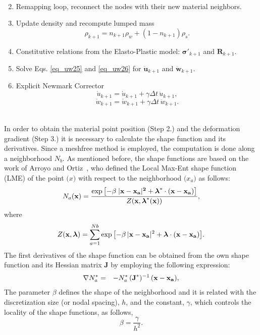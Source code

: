 \documentclass[twocolumn]{svjour3}          %
\begin{document}
\begin{enumerate}
\begin{eqnarray*}
\end{eqnarray*}
\item Remapping loop, reconnect the nodes with their new material neighbors.
\item Update density and recompute lumped mass
$$
\rho_{k+1}=n_{k+1}\rho_{w}+(1-n_{k+1})\rho_s.
$$
\item Constitutive relations from the  Elasto-Plastic model: $\boldsymbol{\sigma'}_{k+1}$ and $\boldsymbol{R}_{k+1}$.
\item Solve Eqs. \ref{eq_uw25} and \ref{eq_uw26} for $\boldsymbol{\ddot{u}}_{k+1}$ and $\boldsymbol{\ddot{w}}_{k+1}$.
\item Explicit Newmark Corrector
$$
\dot{u}_{k+1}=\dot{u}_{k+1}+\gamma \Delta t \, \ddot{u}_{k+1},
$$
$$
\dot{w}_{k+1}=\dot{w}_{k+1}+\gamma \Delta t \, \ddot{w}_{k+1}.
$$\\
\end{enumerate}

In order to obtain the material point position (Step 2.) and the deformation gradient (Step 3.) it is necessary to calculate the shape function and its derivatives. Since a meshfree method is employed, the computation is done along a neighborhood $N_b$. As mentioned before, the shape functions are based on the work of Arroyo and Ortiz~\cite{arroyo2006}, who defined the Local Max-Ent shape function (LME) of the point $\boldsymbol(x)$ with respect to the neighborhood $\boldsymbol(x_a)$ as follows:
\begin{equation} \label{eq_N1}
N_a(\textbf{x})=\frac{\exp\left[ -\beta \; |\bf x-x_a|^2 +  \boldsymbol{\lambda}^*  \cdot  (x-x_a)  \right] } {Z(\textbf{x},\boldsymbol{\lambda}^*(\textbf{x}))},
\end{equation}
where
\begin{equation}\label{eq_N2}
Z({\bf x}, {\boldsymbol{\lambda}}) = \sum_{a=1}^{Nb}{ \exp \left[ -\beta \, |{\bf x-x_a}|^2 + \boldsymbol{\lambda}  \cdot  \bf {(x-x_a)}         \right]}.
\end{equation}
The first derivatives of the shape function can be obtained from the own shape function and its Hessian matrix \textbf{J} by employing the following expression:
\begin{eqnarray}
\nabla N^*_a &=& -N^*_a \,  (\textbf{J}^*)^{-1} \,  (\bf x-x_a) \label{eq_N3} ,
\end{eqnarray}
The parameter $\beta$ defines the shape of the neighborhood and it is related with the discretization size (or nodal spacing), $h$,  and the constant, $\gamma$, which controls the locality of the shape functions, as follows,
\begin{equation}\label{eqLM3}
\beta=\frac{\gamma}{h^2}.
\end{equation} 
\end{document}
